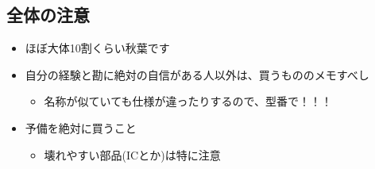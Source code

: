 \documentclass[letterpaper,10pt,dvipdfmx]{sphinxmanual}
\begin{document}
\subsection{全体の注意}
\label{\detokenize{begginers/buy_parts:id4}}\begin{itemize}
\item {} 
ほぼ大体10割くらい秋葉です

\item {} 
自分の経験と勘に絶対の自信がある人以外は、買うもののメモすべし
\begin{itemize}
\item {} 
名称が似ていても仕様が違ったりするので、型番で！！！

\end{itemize}

\item {} 
予備を絶対に買うこと
\begin{itemize}
\item {} 
壊れやすい部品(ICとか)は特に注意

\end{itemize}

\end{itemize}
\end{document}
